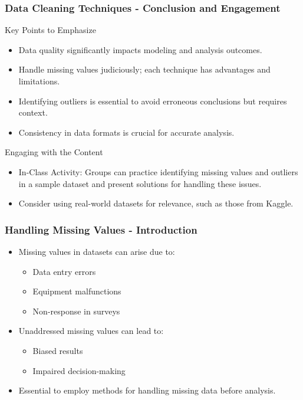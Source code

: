 \documentclass[aspectratio=169]{beamer}
\begin{document}
\begin{frame}[fragile]
    \frametitle{Data Cleaning Techniques - Conclusion and Engagement}
    \begin{block}{Key Points to Emphasize}
        \begin{itemize}
            \item Data quality significantly impacts modeling and analysis outcomes.
            \item Handle missing values judiciously; each technique has advantages and limitations.
            \item Identifying outliers is essential to avoid erroneous conclusions but requires context.
            \item Consistency in data formats is crucial for accurate analysis.
        \end{itemize}
    \end{block}
    \begin{block}{Engaging with the Content}
        \begin{itemize}
            \item In-Class Activity: Groups can practice identifying missing values and outliers in a sample dataset and present solutions for handling these issues.
            \item Consider using real-world datasets for relevance, such as those from Kaggle.
        \end{itemize}
    \end{block}
\end{frame}

\begin{frame}[fragile]
    \frametitle{Handling Missing Values - Introduction}
    \begin{itemize}
        \item Missing values in datasets can arise due to:
        \begin{itemize}
            \item Data entry errors
            \item Equipment malfunctions
            \item Non-response in surveys
        \end{itemize}
        \item Unaddressed missing values can lead to:
        \begin{itemize}
            \item Biased results
            \item Impaired decision-making
        \end{itemize}
        \item Essential to employ methods for handling missing data before analysis.
    \end{itemize}
\end{frame}
\end{document}
